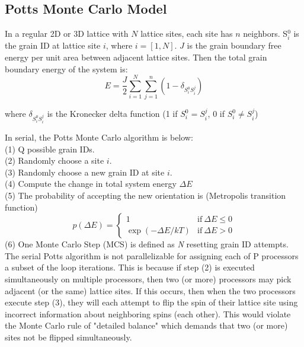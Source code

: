 \documentclass[11pt]{article}
\begin{document}
\begin{multicols*}{2}
\subsection*{Potts Monte Carlo Model}
In a regular 2D or 3D lattice with $N$ lattice sites, each site has $n$ neighbors. S$^0_i$ is the grain ID at lattice site $i$, where $i=[1,N]$. $J$ is the grain boundary free energy per unit area between adjacent lattice sites. Then the total grain boundary energy of the system is:
\begin{equation}
E = \frac{J}{2}\sum_{i=1}^{N} \sum_{j=1}^{n} (1 - \delta_{S^0_i S^j_i})
\label{eqn:pottsE}
\end{equation}

where $\delta_{S^0_i S^j_i}$ is the Kronecker delta function (1 if $S^0_i=S^j_i$, 0 if $S^0_i \neq S^j_i$)

In serial, the Potts Monte Carlo algorithm is below:\\
(1) Q possible grain IDs.\\
(2) Randomly choose a site $i$.\\
(3) Randomly choose a new grain ID at site $i$.\\
(4) Compute the change in total system energy $\Delta E$\\
(5) The probability of accepting the new orientation is (Metropolis transition function)\\
\begin{equation}
p(\Delta E) = \begin{cases} 
		1 		   & \mathrm{if}\ \Delta E \le 0 \\
		\exp(-\Delta E/kT) & \mathrm{if}\ \Delta E > 0
	      \end{cases}
\label{eqn:pottsP}
\end{equation}
(6) One Monte Carlo Step (MCS) is defined as \emph{N} resetting grain ID attempts. \\

The serial Potts algorithm is not parallelizable for assigning each of P processors a subset of the loop iterations. This is because if step (2) is executed simultaneously on multiple processors, then two (or more) processors may pick adjacent (or the same) lattice sites. If this occurs, then when the two processors execute step (3), they will each attempt to flip the spin of their lattice site using incorrect information about neighboring spins (each other). This would violate the Monte Carlo rule of "detailed balance" which demands that two (or more) sites not be flipped simultaneously.


\end{multicols*}
\end{document}
